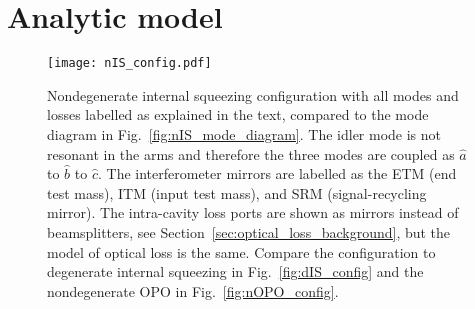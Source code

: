 


\section{Analytic model}
\label{sec:nIS_model}

\begin{figure}
	\centering
	\texttt{[image: nIS\_config.pdf]}
	\caption{ Nondegenerate internal squeezing configuration with all modes and losses labelled as explained in the text, compared to the mode diagram in Fig.~\ref{fig:nIS_mode_diagram}. The idler mode is not resonant in the arms and therefore the three modes are coupled as $\hat a$ to $\hat b$ to $\hat c$. The interferometer mirrors are labelled as the ETM (end test mass), ITM (input test mass), and SRM (signal-recycling mirror). The intra-cavity loss ports are shown as mirrors instead of beamsplitters, see Section~\ref{sec:optical_loss_background}, but the model of optical loss is the same. Compare the configuration to degenerate internal squeezing in Fig.~\ref{fig:dIS_config} and the nondegenerate OPO in Fig.~\ref{fig:nOPO_config}.}
	\label{fig:nIS_config}
\end{figure}

